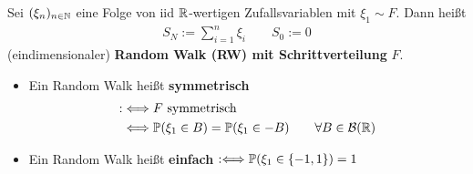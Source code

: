 \begin{defi}\enter %
	Sei $(\xi_n)_{n\in\N}$ eine Folge von iid $\R$-wertigen Zufallsvariablen mit $\xi_1\sim F$. Dann heißt
	\begin{align*}
		S_N:=\sum\limits_{i=1}^n\xi_i\qquad S_0:=0
	\end{align*}
	(eindimensionaler) \textbf{Random Walk (RW) mit Schrittverteilung} $F$.
	\begin{itemize}
		\item Ein Random Walk heißt \textbf{symmetrisch}
		\begin{align*}
			:&\Longleftrightarrow F\text{ symmetrisch}\\
			&\Longleftrightarrow\P(\xi_1\in B)=\P(\xi_1\in -B)\qquad\forall B\in\B(\R)
		\end{align*}
		\item Ein Random Walk heißt \textbf{einfach} 
		$\begin{aligned}
			:\Longleftrightarrow\P(\xi_1\in\lbrace-1,1\rbrace)=1
		\end{aligned}$
	\end{itemize}
\end{defi}

